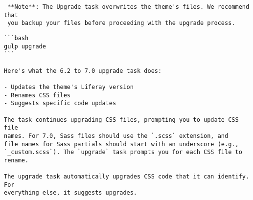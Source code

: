 \noindent\hrulefill

\begin{verbatim}
 **Note**: The Upgrade task overwrites the theme's files. We recommend that 
 you backup your files before proceeding with the upgrade process.
\end{verbatim}

\noindent\hrulefill

\begin{verbatim}
```bash
gulp upgrade
```

Here's what the 6.2 to 7.0 upgrade task does:

- Updates the theme's Liferay version
- Renames CSS files
- Suggests specific code updates

The task continues upgrading CSS files, prompting you to update CSS file 
names. For 7.0, Sass files should use the `.scss` extension, and 
file names for Sass partials should start with an underscore (e.g., 
`_custom.scss`). The `upgrade` task prompts you for each CSS file to rename. 

The upgrade task automatically upgrades CSS code that it can identify. For 
everything else, it suggests upgrades. 
\end{verbatim}


